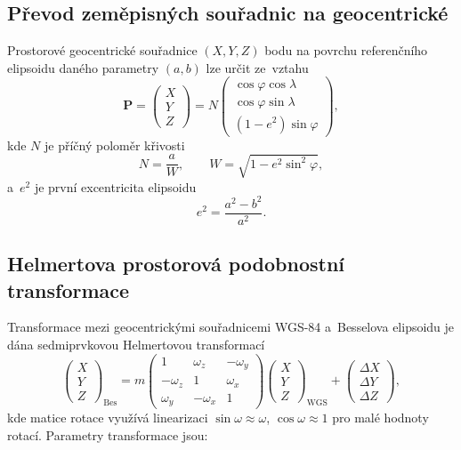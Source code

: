 \documentclass[11pt, a4paper]{article}
\begin{document}
\subsection{Převod zeměpisných souřadnic na geocentrické}

Prostorové geocentrické souřadnice $(X, Y, Z)$ bodu na povrchu referenčního elipsoidu daného parametry $(a, b)$ lze určit ze~vztahu
\begin{equation}
    \mathbf{P} = \begin{pmatrix} X \\ Y \\ Z \end{pmatrix}
    = N \begin{pmatrix} \cos\varphi\cos\lambda \\ \cos\varphi\sin\lambda \\ (1-e^2)\sin\varphi \end{pmatrix},
\end{equation}
kde $N$ je příčný poloměr křivosti
\begin{equation}
    N = \frac{a}{W}, \qquad W = \sqrt{1 - e^2 \sin^2\varphi},
\end{equation}
a~$e^2$ je první excentricita elipsoidu
\begin{equation}
    e^2 = \frac{a^2 - b^2}{a^2}.
\end{equation}

\subsection{Helmertova prostorová podobnostní transformace}

Transformace mezi geocentrickými souřadnicemi WGS-84 a~Besselova elipsoidu je dána sedmiprvkovou Helmertovou transformací
\begin{equation}
    \begin{pmatrix} X \\ Y \\ Z \end{pmatrix}_{\mathrm{Bes}}
    = m \begin{pmatrix} 1 & \omega_z & -\omega_y \\ -\omega_z & 1 & \omega_x \\ \omega_y & -\omega_x & 1 \end{pmatrix}
    \begin{pmatrix} X \\ Y \\ Z \end{pmatrix}_{\mathrm{WGS}}
    + \begin{pmatrix} \Delta X \\ \Delta Y \\ \Delta Z \end{pmatrix},
\end{equation}
kde matice rotace využívá linearizaci $\sin\omega \approx \omega$, $\cos\omega \approx 1$ pro malé hodnoty rotací. Parametry transformace jsou:
\end{document}
